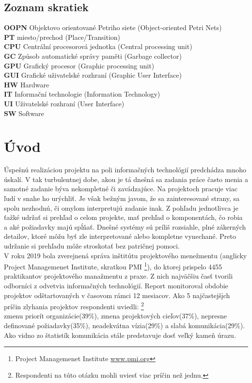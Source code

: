\theoremstyle{definition}
\newtheorem{defn}{Definícia}[section]
\newtheorem{note}{Poznámka}[section]
\newtheorem{exmpl}{Príklad}[section]

\newpage
\section*{Zoznam skratiek}
\textbf{OOPN} Objektovo orientované Petriho siete (Object-oriented Petri Nets)\\
\textbf{PT} miesto/prechod (Place/Transition)\\
\textbf{CPU} Centrální procesorová jednotka (Central processing unit)\\
\textbf{GC} Způsob automatické správy paměti (Garbage collector)\\
\textbf{GPU} Grafický procesor (Graphic processing unit)\\
\textbf{GUI} Grafické uživatelské rozhraní (Graphic User Interface)\\
\textbf{HW} Hardware\\
\textbf{IT} Informační technologie (Information Technology)\\
\textbf{UI} Uživatelské rozhraní (User Interface)\\
\textbf{SW} Software\\
\newpage

\chapter{Úvod}

Úspešnú realizáciou projektu na poli informačných technológií predchádza mnoho úskalí. V tak turbulentnej dobe, akou je tá dnešná sa zadania práce často menia a samotné zadanie býva nekompletné či zavádzajúce. Na projektoch pracuje viac ľudí v snahe ho urýchliť. Je však bežným javom, že sa zainteresované strany, sa spolu nezhodnú, či omylom interpretujú zadanie inak. Z pohľadu jednotlivca je ťažké udržať si prehľad o celom projekte, mať prehľad o komponentách, čo robia a aké požiadavky majú spĺňať. Dnešné systémy sú príliš rozsiahle, plné zákerných detailov, ktoré môžu byť zle interpretované alebo kompletne vynechané. Preto udržanie si prehľadu môže stroskotať bez patričnej pomoci. \\

V roku 2019 bola zverejnená správa inštitútu projektového menežmentu (anglicky Project Managemenet Institute, skratkou PMI \footnote{Project Managemenet Institute \url{www.pmi.org}}), do ktorej prispelo 4455 praktikantov projektového manažmentu z praxe. Z nich najväčšiu časť tvorili odborníci z odvetvia informačných technológií. Report monitoroval obdobie projektov odštartovaných v časovom rámci 12 mesiacov. Ako 5 najčastejšįch príčin zlyhania projektov respondenti uviedli: \footnote{Respondenti na túto otázku mohli uviesť viac príčin než jednu.} \\
zmenu priorít organizácie(39\%), zmena projektových cieľov(37\%), nepresne definované požiadavky(35\%), neadekvátna vízia(29\%) a slabá komunikácia(29\%). \cite{pulse}
Ako vidno zo štatistík komunikácia stále predstavuje dosť veľký kameň úrazu. \\

